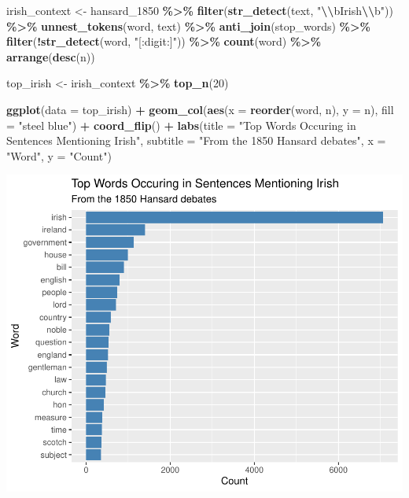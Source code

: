 \documentclass[
]{article}
\newenvironment{Shaded}{\begin{snugshade}}{\end{snugshade}}
\newcommand{\AttributeTok}[1]{\textcolor[rgb]{0.13,0.29,0.53}{#1}}
\newcommand{\DecValTok}[1]{\textcolor[rgb]{0.00,0.00,0.81}{#1}}
\newcommand{\FunctionTok}[1]{\textcolor[rgb]{0.13,0.29,0.53}{\textbf{#1}}}
\newcommand{\NormalTok}[1]{#1}
\newcommand{\OtherTok}[1]{\textcolor[rgb]{0.56,0.35,0.01}{#1}}
\newcommand{\SpecialCharTok}[1]{\textcolor[rgb]{0.81,0.36,0.00}{\textbf{#1}}}
\newcommand{\StringTok}[1]{\textcolor[rgb]{0.31,0.60,0.02}{#1}}
\begin{document}
\begin{Shaded}
\begin{Highlighting}[]
\NormalTok{irish\_context }\OtherTok{\textless{}{-}}\NormalTok{ hansard\_1850 }\SpecialCharTok{\%\textgreater{}\%} 
  \FunctionTok{filter}\NormalTok{(}\FunctionTok{str\_detect}\NormalTok{(text, }\StringTok{"}\SpecialCharTok{\textbackslash{}\textbackslash{}}\StringTok{bIrish}\SpecialCharTok{\textbackslash{}\textbackslash{}}\StringTok{b"}\NormalTok{)) }\SpecialCharTok{\%\textgreater{}\%}
  \FunctionTok{unnest\_tokens}\NormalTok{(word, text) }\SpecialCharTok{\%\textgreater{}\%}
  \FunctionTok{anti\_join}\NormalTok{(stop\_words) }\SpecialCharTok{\%\textgreater{}\%}
  \FunctionTok{filter}\NormalTok{(}\SpecialCharTok{!}\FunctionTok{str\_detect}\NormalTok{(word, }\StringTok{"[:digit:]"}\NormalTok{)) }\SpecialCharTok{\%\textgreater{}\%}
  \FunctionTok{count}\NormalTok{(word) }\SpecialCharTok{\%\textgreater{}\%}
  \FunctionTok{arrange}\NormalTok{(}\FunctionTok{desc}\NormalTok{(n))}
\end{Highlighting}
\end{Shaded}

\begin{Shaded}
\begin{Highlighting}[]
\NormalTok{top\_irish }\OtherTok{\textless{}{-}}\NormalTok{ irish\_context  }\SpecialCharTok{\%\textgreater{}\%}
  \FunctionTok{top\_n}\NormalTok{(}\DecValTok{20}\NormalTok{)}

\FunctionTok{ggplot}\NormalTok{(}\AttributeTok{data =}\NormalTok{ top\_irish) }\SpecialCharTok{+}
  \FunctionTok{geom\_col}\NormalTok{(}\FunctionTok{aes}\NormalTok{(}\AttributeTok{x =} \FunctionTok{reorder}\NormalTok{(word, n), }
               \AttributeTok{y =}\NormalTok{ n),}
           \AttributeTok{fill =} \StringTok{"steel blue"}\NormalTok{) }\SpecialCharTok{+}
  \FunctionTok{coord\_flip}\NormalTok{() }\SpecialCharTok{+}
  \FunctionTok{labs}\NormalTok{(}\AttributeTok{title =} \StringTok{"Top Words Occuring in Sentences Mentioning Irish"}\NormalTok{,}
       \AttributeTok{subtitle =} \StringTok{"From the 1850 Hansard debates"}\NormalTok{,}
       \AttributeTok{x =} \StringTok{"Word"}\NormalTok{,}
       \AttributeTok{y =} \StringTok{"Count"}\NormalTok{) }
\end{Highlighting}
\end{Shaded}

\includegraphics[width=0.8\linewidth]{ch1-11.25.2024_files/figure-latex/unnamed-chunk-52-1}
\end{document}
